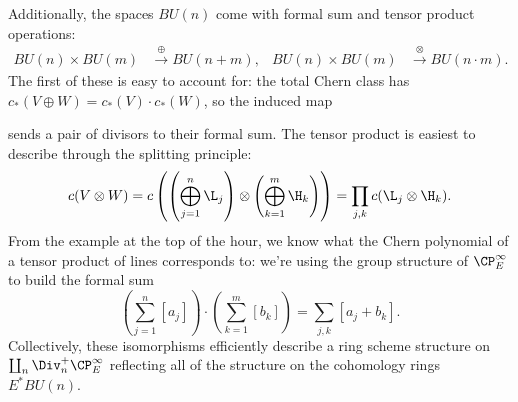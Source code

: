 Additionally, the spaces $BU(n)$ come with formal sum and tensor product operations:
\begin{align*}
BU(n) \times BU(m) & \xrightarrow{\oplus} BU(n+m), & BU(n) \times BU(m) & \xrightarrow{\otimes} BU(n \cdot m).
\end{align*}
The first of these is easy to account for: the total Chern class has $c_*(V \oplus W) = c_*(V) \cdot c_*(W)$, so the induced map
\begin{center}
\end{center}
sends a pair of divisors to their formal sum.  The tensor product is easiest to describe through the splitting principle:
\[
c(V \otimes W) = c\left( \left( \bigoplus_{j=1}^n \L_j\right) \otimes \left( \bigoplus_{k=1}^m \H_k \right)\right) = \prod_{j, k} c(\L_j \otimes \H_k).
\]
From the example at the top of the hour, we know what the Chern polynomial of a tensor product of lines corresponds to: we're using the group structure of $\CP^\infty_E$ to build the formal sum \[\left( \sum_{j=1}^n [a_j] \right) \cdot \left( \sum_{k=1}^m [b_k]\right) = \sum_{j,k} [a_j + b_k].\]  Collectively, these isomorphisms efficiently describe a ring scheme structure on $\coprod_n \Div_n^+ \CP^\infty_E$ reflecting all of the structure on the cohomology rings $E^* BU(n)$.



\oldsection*{$BU[2k, \infty)$}


